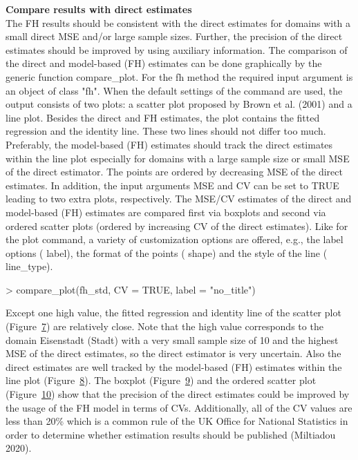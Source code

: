 \hfill\break
\textbf{Compare results with direct estimates}\\
The FH results should be consistent with the direct estimates for
domains with a small direct MSE and/or large sample sizes. Further, the
precision of the direct estimates should be improved by using auxiliary
information. The comparison of the direct and model-based (FH) estimates
can be done graphically by the generic function compare\_plot. For the fh
method the required input argument is an object of class "fh". When
the default settings of the command are used, the output consists of two
plots: a scatter plot proposed by Brown et al. (2001) and a line plot. Besides
the direct and FH estimates, the plot contains the fitted regression and
the identity line. These two lines should not differ too much.
Preferably, the model-based (FH) estimates should track the direct
estimates within the line plot especially for domains with a large
sample size or small MSE of the direct estimator. The points are ordered
by decreasing MSE of the direct estimates. In addition, the input
arguments MSE and CV can be set to TRUE leading to two extra plots,
respectively. The MSE/CV estimates of the direct and model-based (FH)
estimates are compared first via boxplots and second via ordered scatter
plots (ordered by increasing CV of the direct estimates). Like for the
plot command, a variety of customization options are offered, e.g., the
label options ( label), the format of the points ( shape) and the style
of the line ( line\_type).

\begin{example}
\textgreater{} compare\_plot(fh\_std, CV = TRUE, label = "no\_title")
\end{example}

Except one high value, the fitted regression and identity line of the
scatter plot (Figure~\protect\hyperlink{fig:comparea}{7}) are relatively close. Note that the high
value corresponds to the domain Eisenstadt (Stadt) with a very small
sample size of 10 and the highest MSE of the direct estimates, so the
direct estimator is very uncertain. Also the direct estimates are well
tracked by the model-based (FH) estimates within the line plot
(Figure~\protect\hyperlink{fig:compareb}{8}). The boxplot
(Figure~\protect\hyperlink{fig:comparee}{9}) and the ordered scatter plot
(Figure~\protect\hyperlink{fig:comparef}{10}) show that the precision of the direct
estimates could be improved by the usage of the FH model in terms of
CVs. Additionally, all of the CV values are less than 20\% which is a
common rule of the UK Office for National Statistics in order to
determine whether estimation results should be published
(Miltiadou 2020).

